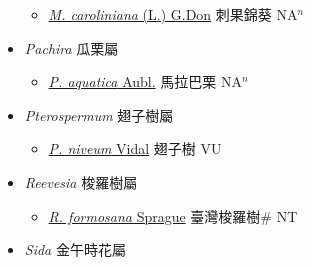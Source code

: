 \begin{itemize}
  \begin{itemize}
        \item[] \href{http://www.theplantlist.org/tpl1.1/search?q=Modiola+caroliniana}{\textit{M. caroliniana} (L.) G.Don}   刺果錦葵 NA$^n$
  \end{itemize}
 \item[] \textit{Pachira} 瓜栗屬
                    
  \begin{itemize}
        \item[] \href{http://www.theplantlist.org/tpl1.1/search?q=Pachira+aquatica}{\textit{P. aquatica} Aubl.}   馬拉巴栗 NA$^n$
  \end{itemize}
 \item[] \textit{Pterospermum} 翅子樹屬
                    
  \begin{itemize}
        \item[] \href{http://www.theplantlist.org/tpl1.1/search?q=Pterospermum+niveum}{\textit{P. niveum} Vidal}   翅子樹 VU
  \end{itemize}
 \item[] \textit{Reevesia} 梭羅樹屬
                    
  \begin{itemize}
        \item[] \href{http://www.theplantlist.org/tpl1.1/search?q=Reevesia+formosana}{\textit{R. formosana} Sprague}   臺灣梭羅樹\# NT
  \end{itemize}
 \item[] \textit{Sida} 金午時花屬
                    

\end{itemize}
